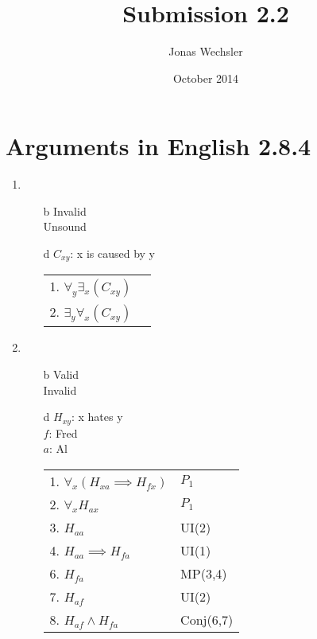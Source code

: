 \documentclass{article}
\title{Submission 2.2}
\author{Jonas Wechsler}
\date{October 2014}
\begin{document}
	\maketitle
	\section{Arguments in English 2.8.4}
	\begin{enumerate}
		\item
			\begin{enumerate}
				\item[b]
					Invalid\\
					Unsound	
				\item[d]
					$C_{xy}$: x is caused by y\\ 
					\begin{tabular}{l l}
						1. $\forall _y \exists _x (C_{xy})$\\
						2. $\exists _y \forall _x (C_{xy})$\\
					\end{tabular}
			\end{enumerate}
		\item
			\begin{enumerate}
				\item[b]
					Valid\\
					Invalid
				\item[d]
					$H_{xy}$: x hates y\\ 
					$f$: Fred\\
					$a$: Al\\
					\begin{tabular}{l l}
						1. $\forall _x (H_{xa} \implies H_{fx})$ & $P_1$\\
						2. $\forall _x H_{ax}$ & $P_1$\\ 
						3. $H_{aa}$ & UI(2)\\
						4. $H_{aa} \implies H_{fa}$ & UI(1)\\
						6. $H_{fa}$ & MP(3,4) \\
						7. $H_{af}$ & UI(2) \\
						8. $H_{af} \land H_{fa}$ & Conj(6,7)\\
					\end{tabular}


\end{enumerate}
\end{enumerate}
\end{document}
